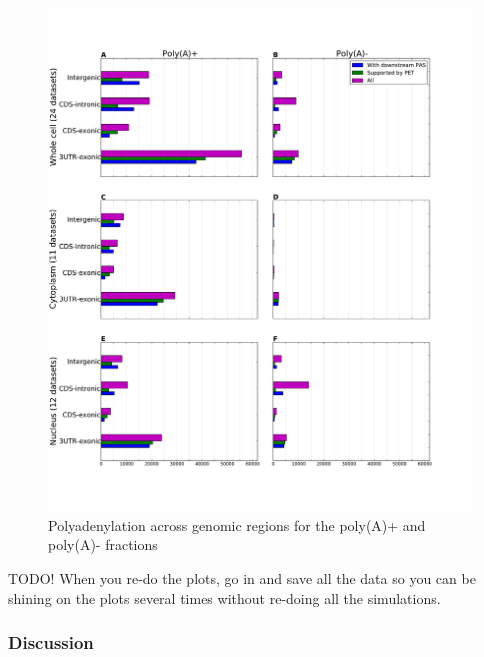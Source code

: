 \begin{figure}[htb]
	\begin{center}
		\includegraphics[scale=0.4]{figures/polyadenylation/Sidebars_pA_2+.pdf}
	\end{center}
	\caption{Polyadenylation across genomic regions for the poly(A)+ and poly(A)-
	fractions}
	\label{fig:sidebars}
\end{figure}

TODO! When you re-do the plots, go in and save all the data so you can be
shining on the plots several times without re-doing all the simulations.

\subsubsection{Discussion}
